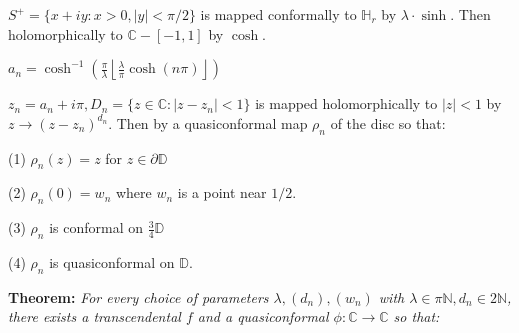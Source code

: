 \documentclass{beamer}
\begin{document}
\begin{frame} 

{\tiny $S^+ = \{ x + iy : x > 0, |y| < \pi/2 \}$ is mapped conformally to $\mathbb{H}_r$ by $\lambda\cdot\sinh$. Then holomorphically to $\mathbb{C} - [-1,1]$ by $\cosh$.

\vspace{2.5mm}

$a_n = \cosh^{-1}\left( \frac{\pi}{\lambda} \left \lfloor{ \frac{\lambda}{\pi} \cosh(n\pi) }\right \rfloor \right)$

\vspace{2.5mm}

$z_n = a_n + i\pi, D_n = \{ z \in \mathbb{C} : \left| z - z_n \right| < 1\} $ is mapped holomorphically to $|z|<1$ by $z\rightarrow (z - z_n)^{d_n}$. Then by a quasiconformal map $\rho_n$ of the disc so that: 

\hspace{5mm} (1) $\rho_n(z)=z$ for $z\in\partial\mathbb{D}$

\hspace{5mm} (2) $\rho_n(0)=w_n$ where $w_n$ is a point near $1/2$.

\hspace{5mm} (3) $\rho_n$ is conformal on $\frac{3}{4}\mathbb{D}$

\hspace{5mm} (4) $\rho_n$ is quasiconformal on $\mathbb{D}$.  

}

\vspace{5mm}

{\bf Theorem:}  {\it For every choice of parameters $\lambda, (d_n), (w_n)$ with $\lambda \in \pi\mathbb{N}, d_n \in 2\mathbb{N}$, there exists a transcendental $f$ and a quasiconformal $\phi: \mathbb{C}\rightarrow\mathbb{C}$ so that:}


\end{frame}
\end{document}
